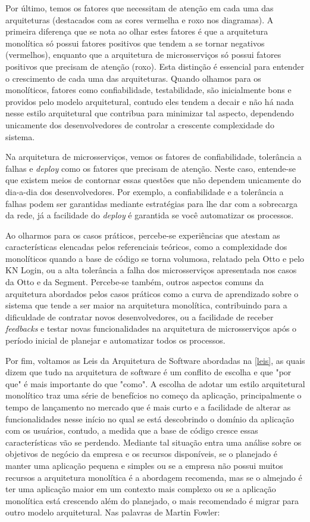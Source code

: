 Por último, temos os fatores que necessitam de atenção em cada uma das arquiteturas (destacados com as
cores vermelha e roxo nos diagramas). A primeira diferença que se nota ao olhar estes fatores é que
a arquitetura monolítica só possui fatores positivos que tendem a se tornar negativos (vermelhos),
enquanto que a arquitetura de microsserviços só possui fatores positivos que precisam de atenção
(roxo). Esta distinção é essencial para entender o crescimento de cada uma das arquiteturas. Quando
olhamos para os monolíticos, fatores como confiabilidade, testabilidade, são inicialmente bons e
providos pelo modelo arquitetural, contudo eles tendem a decair e não há nada nesse estilo arquitetural
que contribua para minimizar tal aspecto, dependendo unicamente dos desenvolvedores de controlar a
crescente complexidade do sistema.

Na arquitetura de microsserviços, vemos os fatores de confiabilidade, tolerância a falhas e \textit{deploy}
como os fatores que precisam de atenção. Neste caso, entende-se que existem meios de contornar essas
questões que não dependem unicamente do dia-a-dia dos desenvolvedores. Por exemplo, a confiabilidade
e a tolerância a falhas podem ser garantidas mediante estratégias para lhe dar com a sobrecarga da
rede, já a facilidade do \textit{deploy} é garantida se você automatizar os processos.

Ao olharmos para os casos práticos, percebe-se experiências que atestam as características elencadas
pelos referenciais teóricos, como a complexidade dos monolíticos quando a base de código se torna
volumosa, relatado pela Otto e pelo KN Login, ou a alta tolerância a falha dos microsserviços
apresentada nos casos da Otto e da Segment. Percebe-se também, outros aspectos comuns da arquitetura
abordados pelos casos práticos como a curva de aprendizado sobre o sistema que tende a ser maior na
arquitetura monolítica, contribuindo para a dificuldade de contratar novos desenvolvedores, ou a
facilidade de receber \textit{feedbacks} e testar novas funcionalidades na arquitetura de
microsserviços após o período inicial de planejar e automatizar todos os processos.

Por fim, voltamos as Leis da Arquitetura de Software abordadas na \autoref{leis}, as quais dizem que
tudo na arquitetura de software é um conflito de escolha e que "por que" é mais importante do que
"como". A escolha de adotar um estilo arquitetural monolítico traz uma série de benefícios no começo
da aplicação, principalmente o tempo de lançamento no mercado que é mais curto e a facilidade de
alterar as funcionalidades nesse início no qual se está descobrindo o domínio da aplicação com os
usuários, contudo, a medida que a base de código cresce essas características vão se perdendo.
Mediante tal situação entra uma análise sobre os objetivos de negócio da empresa e os recursos
disponíveis, se o planejado é manter uma aplicação pequena e simples ou se a empresa não possui muitos
recursos a arquitetura monolítica é a abordagem recomenda, mas se o almejado é ter uma aplicação maior
em um contexto mais complexo ou se a aplicação monolítica está crescendo além do planejado, o mais
recomendado é migrar para outro modelo arquitetural. Nas palavras de Martin Fowler:

